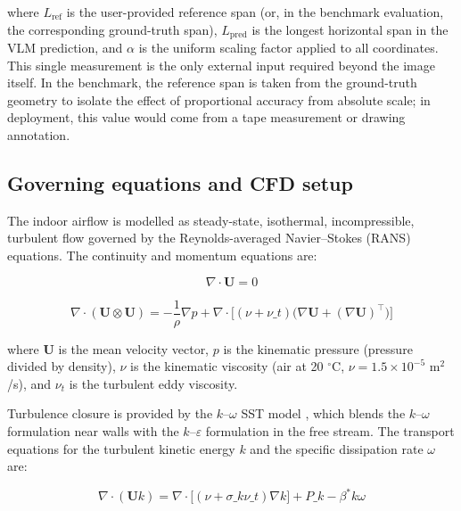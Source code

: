 \documentclass[preprint,12pt,number]{elsarticle}
\begin{document}
where $L_\text{ref}$ is the user-provided reference span (or, in the benchmark evaluation, the corresponding ground-truth span), $L_\text{pred}$ is the longest horizontal span in the VLM prediction, and $\alpha$ is the uniform scaling factor applied to all coordinates. This single measurement is the only external input required beyond the image itself. In the benchmark, the reference span is taken from the ground-truth geometry to isolate the effect of proportional accuracy from absolute scale; in deployment, this value would come from a tape measurement or drawing annotation.

\subsection{Governing equations and CFD setup}
\label{sec:governing-equations-and-cfd-setup}


The indoor airflow is modelled as steady-state, isothermal, incompressible, turbulent flow governed by the Reynolds-averaged Navier--Stokes (RANS) equations. The continuity and momentum equations are:

\begin{equation}
\nabla \cdot \mathbf{U} = 0
\label{eq:continuity}
\end{equation}

\begin{equation}
\nabla \cdot (\mathbf{U} \otimes \mathbf{U}) = -\frac{1}{\rho}\nabla p + \nabla \cdot \bigl[(\nu + \nu\_t)\bigl(\nabla \mathbf{U} + (\nabla \mathbf{U})^\top\bigr)\bigr]
\label{eq:momentum}
\end{equation}

where $\mathbf{U}$ is the mean velocity vector, $p$ is the kinematic pressure (pressure divided by density), $\nu$ is the kinematic viscosity (air at 20 $^\circ$C, $\nu = 1.5 \times 10^{-5}$ m$^2$/s), and $\nu_t$ is the turbulent eddy viscosity.

Turbulence closure is provided by the $k$--$\omega$ SST model \cite{menter1994TwoequationEddyviscosity}, which blends the $k$--$\omega$ formulation near walls with the $k$--$\varepsilon$ formulation in the free stream. The transport equations for the turbulent kinetic energy $k$ and the specific dissipation rate $\omega$ are:

\begin{equation}
\nabla \cdot (\mathbf{U} k) = \nabla \cdot \bigl[(\nu + \sigma\_k \nu\_t) \nabla k\bigr] + P\_k - \beta^* k \omega
\label{eq:k-transport}
\end{equation}
\end{document}

